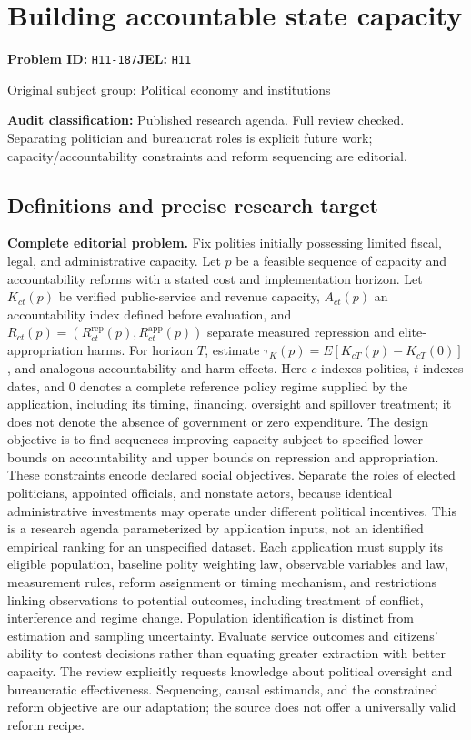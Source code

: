 \documentclass[11pt,a4paper]{article}
\begin{document}
\section*{Building accountable state capacity}
\textbf{Problem ID:} \texttt{H11-187}\quad \textbf{JEL:} \texttt{H11}\par
\label{problem:OP-0381}
{\sffamily\small\color{muted}Original subject group: Political economy and institutions\par}
\label{definitions:problem:30007663}
\textbf{Audit classification:} Published research agenda. Full review checked. Separating politician and bureaucrat roles is explicit future work; capacity/accountability constraints and reform sequencing are editorial.
\subsection*{Definitions and precise research target}
\textbf{Complete editorial problem.} Fix polities initially possessing limited fiscal, legal, and administrative capacity. Let \(p\) be a feasible sequence of capacity and accountability reforms with a stated cost and implementation horizon. Let \(K_{ct}(p)\) be verified public-service and revenue capacity, \(A_{ct}(p)\) an accountability index defined before evaluation, and \(R_{ct}(p)=(R^{\mathrm{rep}}_{ct}(p),R^{\mathrm{app}}_{ct}(p))\) separate measured repression and elite-appropriation harms. For horizon \(T\), estimate \(\tau_K(p)=E[K_{cT}(p)-K_{cT}(0)]\), and analogous accountability and harm effects. Here \(c\) indexes polities, \(t\) indexes dates, and \(0\) denotes a complete reference policy regime supplied by the application, including its timing, financing, oversight and spillover treatment; it does not denote the absence of government or zero expenditure. The design objective is to find sequences improving capacity subject to specified lower bounds on accountability and upper bounds on repression and appropriation. These constraints encode declared social objectives. Separate the roles of elected politicians, appointed officials, and nonstate actors, because identical administrative investments may operate under different political incentives. This is a research agenda parameterized by application inputs, not an identified empirical ranking for an unspecified dataset. Each application must supply its eligible population, baseline polity weighting law, observable variables and law, measurement rules, reform assignment or timing mechanism, and restrictions linking observations to potential outcomes, including treatment of conflict, interference and regime change. Population identification is distinct from estimation and sampling uncertainty. Evaluate service outcomes and citizens' ability to contest decisions rather than equating greater extraction with better capacity. The review explicitly requests knowledge about political oversight and bureaucratic effectiveness. Sequencing, causal estimands, and the constrained reform objective are our adaptation; the source does not offer a universally valid reform recipe.
\end{document}
